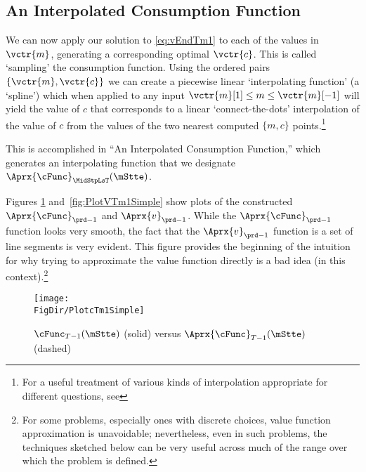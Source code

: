 \documentclass[titlepage, headings=optiontotocandhead]{Resources/texmf-local/tex/latex/econtex}
\begin{document}
\hypertarget{an-interpolated-consumption-function}{}
\subsection{An Interpolated Consumption Function} \label{subsec:LinInterp}

We can now apply our solution to \eqref{eq:vEndTm1} to each of the values in $\vctr{m}$, generating a corresponding optimal $\vctr{c}$.  This is called `sampling' the consumption function.  Using the ordered pairs $\{\vctr{m},\vctr{c}\}$ we can create a piecewise linear `interpolating function' (a `spline') which when applied to any input $\vctr{m}[1] \leq  m\leq \vctr{m}[-1]$ will yield the value of $c$ that corresponds to a linear `connect-the-dots' interpolation of the value of $c$ from the values of the two nearest computed $\{m,c\}$ points.\footnote{For a useful treatment of various kinds of interpolation appropriate for different questions, see } %

This is accomplished in ``An Interpolated Consumption Function,'' which generates an interpolating function that we designate $\Aprx{\cFunc}_{\MidStpLsT}(\mStte)$. %

Figures \ref{fig:PlotcTm1Simple} and~\ref{fig:PlotVTm1Simple} show
plots of the constructed $\Aprx{\cFunc}_{\prd-1}$ and $\Aprx{v}_{\prd-1}$. While the $\Aprx{\cFunc}_{\prd-1}$ function looks very smooth, the fact that the $\Aprx{v}_{\prd-1}$ function is a set of line segments is very evident.  This figure provides the beginning of the intuition for why trying to approximate the value function directly is a bad idea (in this context).\footnote{For some problems, especially ones with discrete choices, value function approximation is unavoidable; nevertheless, even in such problems, the techniques sketched below can be very useful across much of the range over which the problem is defined.}

\hypertarget{PlotcTm1Simple}{}
\begin{figure}
  \centerline{\texttt{[image: \\FigDir/PlotcTm1Simple]}}
  \caption{$\cFunc_{T-1}(\mStte)$ (solid) versus $\Aprx{\cFunc}_{T-1}(\mStte)$ (dashed)}
  \label{fig:PlotcTm1Simple}
\end{figure}
\end{document}
